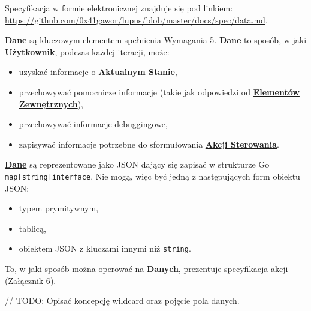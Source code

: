 \label{appendix:5}

Specyfikacja w formie elektronicznej znajduje się pod linkiem: \url{https://github.com/0x41gawor/lupus/blob/master/docs/spec/data.md}.

\hyperlink{def:dane}{\textbf{Dane}} są kluczowym elementem spełnienia \hyperref[req:5]{Wymagania 5}. \hyperlink{def:dane}{\textbf{Dane}} to sposób, w jaki \hyperlink{def:uzytkownik}{\textbf{Użytkownik}}, podczas każdej iteracji, może:
\begin{itemize}
    \item uzyskać informacje o \hyperlink{def:stan-aktualny}{\textbf{Aktualnym Stanie}},
    \item przechowywać pomocnicze informacje (takie jak odpowiedzi od \hyperlink{def:element-zewnetrzny}{\textbf{Elementów Zewnętrznych}}),
    \item przechowywać informacje debuggingowe,
    \item zapisywać informacje potrzebne do sformułowania \hyperlink{def:akcja-sterujaca}{\textbf{Akcji Sterowania}}.
\end{itemize}

\hyperlink{def:dane}{\textbf{Dane}} są reprezentowane jako JSON dający się zapisać w strukturze Go \texttt{map[string]interface{}}. Nie mogą, więc być jedną z następujących form obiektu JSON:
\begin{itemize}
    \item typem prymitywnym,
    \item tablicą,
    \item obiektem JSON z kluczami innymi niż \texttt{string}.
\end{itemize}

To, w jaki sposób można operować na \hyperlink{def:dane}{\textbf{Danych}}, prezentuje specyfikacja akcji (\hyperref[appendix:6]{Załącznik 6}).

// TODO: Opisać koncepcję wildcard oraz pojęcie pola danych.
